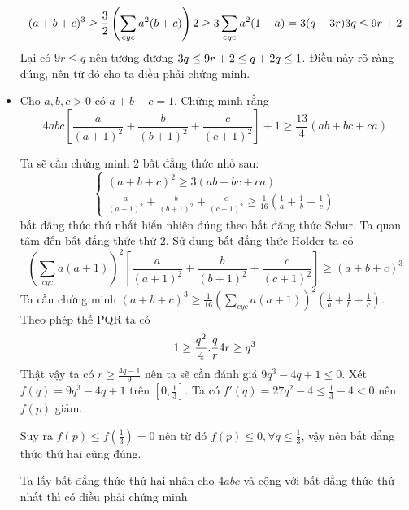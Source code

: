 \documentclass[11pt]{scrartcl}
\begin{document}
\begin{itemize}[label=, leftmargin=0em, itemsep=0.5em]
\begin{sol}
                \[
                    (a + b + c)^3 \geq  \frac{3}{2}\left(\sum_{cyc}a^2(b + c)\right) \lra 2 \geq 3\sum_{cyc}a^2(1 -a) = 3(q - 3r) \lra 3q \leq 9r + 2
                \]
                Lại có $9r \leq q$ nên tương đương $3q \leq 9r + 2 \leq q + 2 \lra q \leq 1$. Điều này rõ ràng đúng, nên từ đó cho ta điều phải chứng minh.
            \end{sol}
            \item\begin{btvn}
                Cho $a,b,c > 0$ có $a + b + c = 1$. Chứng minh rằng
                \[
                    4abc\left[\frac{a}{(a + 1)^2} + \frac{b}{(b + 1)^2} + \frac{c}{(c + 1)^2}\right] + 1 \geq \frac{13}{4}(ab + bc + ca)
                \]
            \end{btvn}
            \begin{sol}
                Ta sẽ cần chứng minh 2 bất đẳng thức nhỏ sau:
                \[
                \left\{
                    \begin{array}{l}
                        (a + b + c)^2 \geq 3(ab + bc + ca)\\
                        \frac{a}{(a + 1)^2} + \frac{b}{(b + 1)^2} + \frac{c}{(c + 1)^2}\geq \frac{1}{16}\left(\frac{1}{a} + \frac{1}{b} + \frac{1}{c}\right)
                    \end{array}
                \right.\]
                bất đẳng thức thứ nhất hiển nhiên đúng theo bất đẳng thức Schur. Ta quan tâm đến bất đẳng thức thứ 2. Sử dụng bất đẳng thức Holder ta có 
                \[
                    \left(\sum_{cyc}a(a + 1)\right)^2\left[\frac{a}{(a + 1)^2} + \frac{b}{(b + 1)^2} + \frac{c}{(c + 1)^2}\right] \geq (a + b + c)^3
                \]
                Ta cần chứng minh $\displaystyle (a + b + c)^3 \geq \frac{1}{16}\left(\sum_{cyc}a(a + 1)\right)^2\left(\frac{1}{a} + \frac{1}{b} + \frac{1}{c}\right)$. Theo phép thế PQR ta có
                \[
                    1 \geq \frac{q^2}{4}.\frac{q}{r} \lra 4r \geq q^3
                \]
                Thật vậy ta có $r \geq \frac{4q - 1}{9}$ nên ta sẽ cần đánh giá 
                $9q^3 - 4q + 1 \leq 0$. Xét $f(q) = 9q^3 - 4q + 1$ trên $[0,\frac{1}{3}]$. Ta có $f'(q) = 27q^2 - 4 \leq \frac{1}{3} - 4 < 0$ nên $f(p)$ giảm.
    
    
                Suy ra $f(p) \leq f(\frac{1}{3}) = 0$ nên từ đó $f(p) \leq 0, \forall q \leq \frac{1}{3}$, vậy nên bất đẳng thức thứ hai cũng đúng.
    
    
                Ta lấy bất đẳng thức thứ hai nhân cho $4abc$ và cộng với bất đẳng thức thứ nhất thì có điều phải chứng minh.
                

\end{sol}
\end{itemize}
\end{document}
